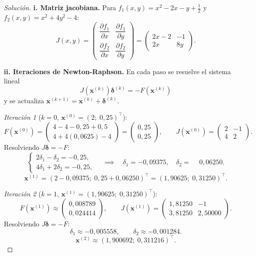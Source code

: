 \documentclass[a4,11pt]{aleph-notas}
\begin{document}
\begin{proof}[Solución]\hspace{0pt}

\textbf{i. Matriz jacobiana.}
Para $f_1(x,y)=x^2-2x-y+\tfrac{1}{2}$ y $f_2(x,y)=x^2+4y^2-4$:
\[
    J(x,y)
    = \begin{pmatrix}
        \dfrac{\partial f_1}{\partial x} & \dfrac{\partial f_1}{\partial y}\\[8pt]
        \dfrac{\partial f_2}{\partial x} & \dfrac{\partial f_2}{\partial y}
      \end{pmatrix}
    = \begin{pmatrix} 2x-2 & -1 \\ 2x & 8y \end{pmatrix}.
\]

\textbf{ii. Iteraciones de Newton-Raphson.}
En cada paso se resuelve el sistema lineal
\[
    J\!\left(\mathbf{x}^{(k)}\right)\boldsymbol{\delta}^{(k)}
    = -F\!\left(\mathbf{x}^{(k)}\right)
\]
y se actualiza $\mathbf{x}^{(k+1)}=\mathbf{x}^{(k)}+\boldsymbol{\delta}^{(k)}$.

\medskip
\textit{Iteración 1} ($k=0$, $\mathbf{x}^{(0)}=(2;\;0{,}25)^\top$):
\[
    F\!\left(\mathbf{x}^{(0)}\right)
    = \begin{pmatrix} 4-4-0{,}25+0{,}5\\ 4+4(0{,}0625)-4 \end{pmatrix}
    = \begin{pmatrix} 0{,}25\\ 0{,}25 \end{pmatrix},
    \qquad
    J\!\left(\mathbf{x}^{(0)}\right)
    = \begin{pmatrix} 2 & -1\\ 4 & 2 \end{pmatrix}.
\]
Resolviendo $J\boldsymbol{\delta}=-F$:
\[
    \begin{cases} 2\delta_1-\delta_2=-0{,}25,\\[3pt] 4\delta_1+2\delta_2=-0{,}25, \end{cases}
    \quad\implies\quad
    \delta_1=-0{,}09375,\quad
    \delta_2=\phantom{-}0{,}06250.
\]
\[
    \mathbf{x}^{(1)}
    = (2-0{,}09375;\;0{,}25+0{,}06250)^\top
    = (1{,}90625;\;0{,}31250)^\top.
\]

\textit{Iteración 2} ($k=1$, $\mathbf{x}^{(1)}=(1{,}90625;\;0{,}31250)^\top$):
\[
    F\!\left(\mathbf{x}^{(1)}\right)
    \approx \begin{pmatrix} 0{,}008789\\ 0{,}024414 \end{pmatrix},
    \qquad
    J\!\left(\mathbf{x}^{(1)}\right)
    = \begin{pmatrix} 1{,}81250 & -1\\ 3{,}81250 & 2{,}50000 \end{pmatrix}.
\]
Resolviendo $J\boldsymbol{\delta}=-F$:
\[
    \delta_1 \approx -0{,}005558,\qquad
    \delta_2 \approx -0{,}001284.
\]
\[
    \mathbf{x}^{(2)} \approx (1{,}900692;\;0{,}311216)^\top.
\]


\end{proof}
\end{document}
